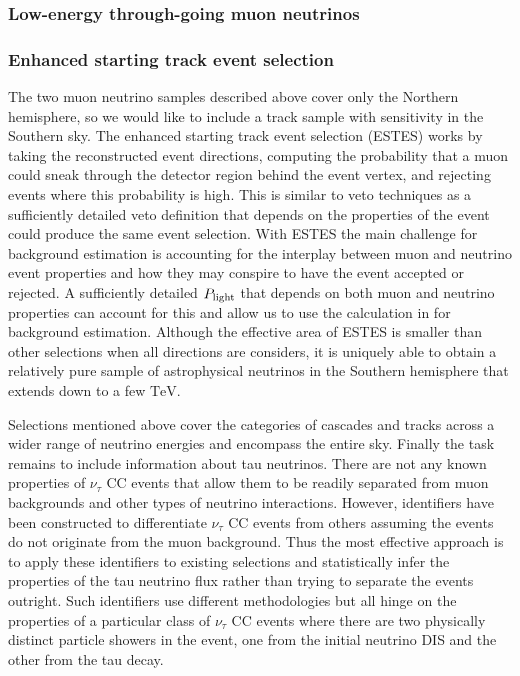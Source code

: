 \subsubsection{Low-energy through-going muon neutrinos}


\subsubsection{Enhanced starting track event selection}
The two muon neutrino samples described above cover only the Northern hemisphere, so we would like to include a track sample with sensitivity in the Southern sky.
The enhanced starting track event selection (ESTES) works by taking the reconstructed event directions, computing the probability that a muon could sneak through the detector region behind the event vertex, and rejecting events where this probability is high.
This is similar to veto techniques as a sufficiently detailed veto definition that depends on the properties of the event could produce the same event selection.
With ESTES the main challenge for background estimation is accounting for the interplay between muon and neutrino event properties and how they may conspire to have the event accepted or rejected.
A sufficiently detailed $P_{\rm light}$ that depends on both muon and neutrino properties can account for this and allow us to use the calculation in  for background estimation.
Although the effective area of ESTES is smaller than other selections when all directions are considers, it is uniquely able to obtain a relatively pure sample of astrophysical neutrinos in the Southern hemisphere that extends down to a few $\si\TeV$.

Selections mentioned above cover the categories of cascades and tracks across a wider range of neutrino energies and encompass the entire sky.
Finally the task remains to include information about tau neutrinos.
There are not any known properties of $\nu_\tau$ CC events that allow them to be readily separated from muon backgrounds and other types of neutrino interactions.
However, identifiers have been constructed to differentiate $\nu_\tau$ CC events from others assuming the events do not originate from the muon background.
Thus the most effective approach is to apply these identifiers to existing selections and statistically infer the properties of the tau neutrino flux rather than trying to separate the events outright.
Such identifiers use different methodologies but all hinge on the properties of a particular class of $\nu_\tau$ CC events where there are two physically distinct particle showers in the event, one from the initial neutrino DIS and the other from the tau decay.

